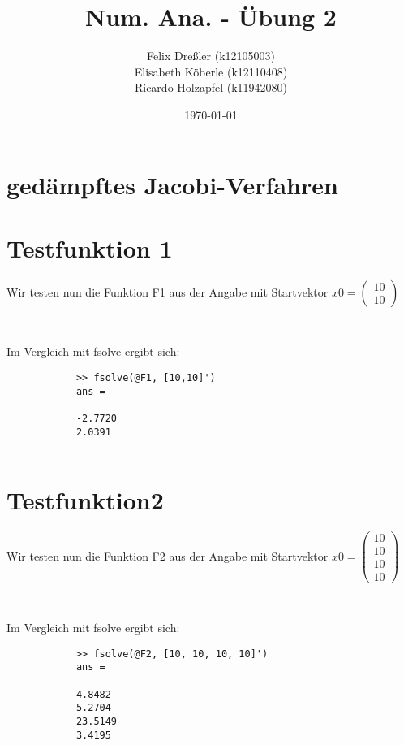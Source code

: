 \documentclass[11pt,titlepage]{article}
\title{Num. Ana. - Übung 2}
\author{Felix Dreßler (k12105003) \\ Elisabeth Köberle (k12110408) \\ Ricardo Holzapfel (k11942080)}
\date{\today} %
\begin{document}
\maketitle
	
	\section{gedämpftes Jacobi-Verfahren}
		


\newpage
	\section{Testfunktion 1}
		Wir testen nun die Funktion F1 aus der Angabe mit Startvektor $ x0 = \begin{pmatrix} 10 \\ 10\end{pmatrix} $
		
		\begin{lstlisting}
			
		\end{lstlisting}
	
		Im Vergleich mit fsolve ergibt sich:
		
		\begin{lstlisting}
			>> fsolve(@F1, [10,10]')
			ans =
			
			-2.7720
			2.0391
			
		\end{lstlisting}
		
	\section{Testfunktion2}
		Wir testen nun die Funktion F2 aus der Angabe mit Startvektor $ x0 = \begin{pmatrix} 10 \\ 10 \\ 10 \\10 \end{pmatrix} $
		
		\begin{lstlisting}
			
		\end{lstlisting}
		
		Im Vergleich mit fsolve ergibt sich:
		
		\begin{lstlisting}
			>> fsolve(@F2, [10, 10, 10, 10]')
			ans =
			
			4.8482
			5.2704
			23.5149
			3.4195	
		\end{lstlisting}
		
\end{document}
